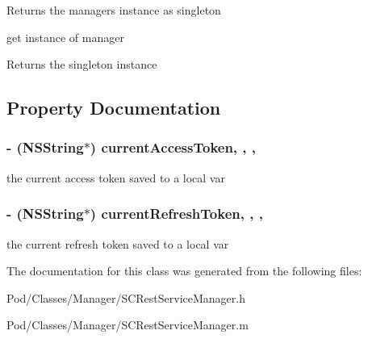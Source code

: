 \begin{DoxyReturn}{Returns}
the manager\textquotesingle{}s instance as singleton
\end{DoxyReturn}
get instance of manager

\begin{DoxyReturn}{Returns}
the singleton instance 
\end{DoxyReturn}


\subsection{Property Documentation}
\subsubsection[{\texorpdfstring{current\+Access\+Token}{currentAccessToken}}]{\setlength{\rightskip}{0pt plus 5cm}-\/ (N\+S\+String$\ast$) current\+Access\+Token\hspace{0.3cm}{\ttfamily [read]}, {\ttfamily [write]}, {\ttfamily [nonatomic]}, {\ttfamily [retain]}}\hypertarget{interface_s_c_rest_service_manager_ab0c230f3dfbee06f085774e0802a0e6a}{}\label{interface_s_c_rest_service_manager_ab0c230f3dfbee06f085774e0802a0e6a}
the current access token saved to a local var 
\subsubsection[{\texorpdfstring{current\+Refresh\+Token}{currentRefreshToken}}]{\setlength{\rightskip}{0pt plus 5cm}-\/ (N\+S\+String$\ast$) current\+Refresh\+Token\hspace{0.3cm}{\ttfamily [read]}, {\ttfamily [write]}, {\ttfamily [nonatomic]}, {\ttfamily [retain]}}\hypertarget{interface_s_c_rest_service_manager_ab752cca020008931ba176247990e3fa2}{}\label{interface_s_c_rest_service_manager_ab752cca020008931ba176247990e3fa2}
the current refresh token saved to a local var 

The documentation for this class was generated from the following files\+:\begin{DoxyCompactItemize}
\item 
Pod/\+Classes/\+Manager/S\+C\+Rest\+Service\+Manager.\+h\item 
Pod/\+Classes/\+Manager/S\+C\+Rest\+Service\+Manager.\+m\end{DoxyCompactItemize}
